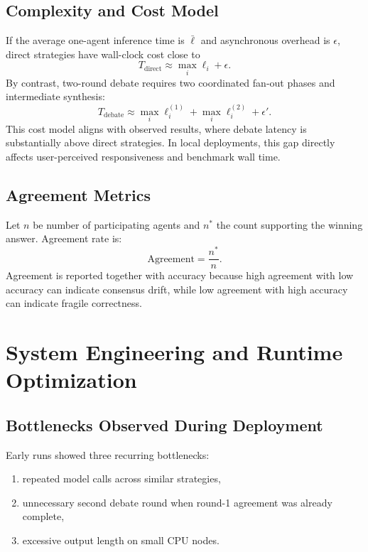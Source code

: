 \documentclass[conference]{IEEEtran}
\begin{document}
\subsection{Complexity and Cost Model}
If the average one-agent inference time is $\bar{\ell}$ and asynchronous overhead is $\epsilon$, direct strategies have wall-clock cost close to
\begin{equation}
T_{\text{direct}} \approx \max_i \ell_i + \epsilon.
\end{equation}
By contrast, two-round debate requires two coordinated fan-out phases and intermediate synthesis:
\begin{equation}
T_{\text{debate}} \approx \max_i \ell_i^{(1)} + \max_i \ell_i^{(2)} + \epsilon'.
\end{equation}
This cost model aligns with observed results, where debate latency is substantially above direct strategies. In local deployments, this gap directly affects user-perceived responsiveness and benchmark wall time.

\subsection{Agreement Metrics}
Let $n$ be number of participating agents and $n^*$ the count supporting the winning answer. Agreement rate is:
\begin{equation}
\text{Agreement} = \frac{n^*}{n}.
\end{equation}
Agreement is reported together with accuracy because high agreement with low accuracy can indicate consensus drift, while low agreement with high accuracy can indicate fragile correctness.

\section{System Engineering and Runtime Optimization}
\subsection{Bottlenecks Observed During Deployment}
Early runs showed three recurring bottlenecks:
\begin{enumerate}
  \item repeated model calls across similar strategies,
  \item unnecessary second debate round when round-1 agreement was already complete,
  \item excessive output length on small CPU nodes.
\end{enumerate}
\end{document}
